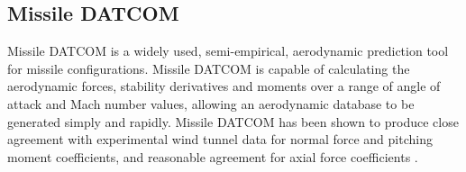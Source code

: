 \subsection{Missile DATCOM}
Missile DATCOM is a widely used, semi-empirical, aerodynamic prediction tool for missile configurations. Missile DATCOM is capable of calculating the aerodynamic forces, stability derivatives and moments over a range of angle of attack and Mach number values, allowing an aerodynamic database to be generated simply and rapidly. Missile DATCOM has been shown to produce close agreement with experimental wind tunnel data for normal force and pitching moment coefficients, and reasonable agreement for axial force coefficients \cite{Sooy2005}. 


      
      
      
      
